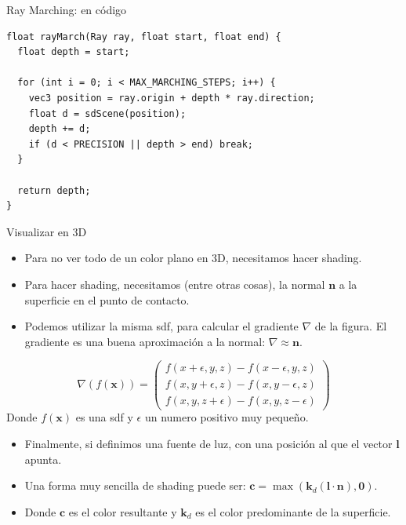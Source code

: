 \begin{frame}[fragile]{Ray Marching: en código}
\begin{listing}
\begin{verbatim}
float rayMarch(Ray ray, float start, float end) {
  float depth = start;

  for (int i = 0; i < MAX_MARCHING_STEPS; i++) {
    vec3 position = ray.origin + depth * ray.direction;
    float d = sdScene(position);
    depth += d;
    if (d < PRECISION || depth > end) break;
  }

  return depth;
}
\end{verbatim}
\end{listing}

\end{frame}

\begin{frame}{Visualizar en 3D}
\begin{itemize}
    \item Para no ver todo de un color plano en 3D, necesitamos hacer shading.
    \item Para hacer shading, necesitamos (entre otras cosas), la normal $\mathbf{n}$ a la superficie en el punto de contacto.
    \item Podemos utilizar la misma sdf, para calcular el gradiente $\nabla$ de la figura. El gradiente es una buena aproximación a la normal: $\nabla \approx \mathbf{n}$.
\end{itemize}
$$\nabla (f(\mathbf{x})) = \begin{pmatrix}
f(x + \epsilon, y, z) - f(x - \epsilon, y, z)\\
f(x, y + \epsilon, z) - f(x, y - \epsilon, z)\\
f(x, y, z + \epsilon) - f(x, y, z - \epsilon)
\end{pmatrix}$$
Donde $f(\mathbf{x})$ es una sdf y $\epsilon$ un numero positivo muy pequeño.
\begin{itemize}
    \item Finalmente, si definimos una fuente de luz, con una posición al que el vector $\mathbf{l}$ apunta.
    \item Una forma muy sencilla de shading puede ser: $\mathbf{c} = \max(\mathbf{k}_d (\mathbf{l} \cdot \mathbf{n}), \mathbf{0})$.
    \item Donde $\mathbf{c}$ es el color resultante y $\mathbf{k}_d$ es el color predominante de la superficie.
\end{itemize}
\end{frame}

